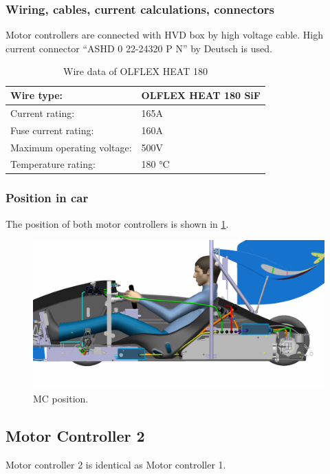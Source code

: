 \subsubsection{Wiring, cables, current calculations, connectors}

Motor controllers are connected with HVD box by high voltage cable. High current connector “ASHD 0 22-24320 P N” by Deutsch is used. 

\begin{table}[H]
	\centering
	\caption{Wire data of OLFLEX HEAT 180}
	\begin{tabularx}{\textwidth}{|X|X|}\hline
		Wire type: & OLFLEX HEAT 180 SiF  \\[\TableSize]\hline
		Current rating: & 165A \\[\TableSize]\hline
		Fuse current rating: & 160A \\[\TableSize]\hline
		Maximum operating voltage: & 500V \\[\TableSize]\hline
		Temperature rating: & 180 °C \\[\TableSize]\hline
	\end{tabularx}%
	\label{tab:MC:wire}%
\end{table}%

\subsubsection{Position in car}

The position of both motor controllers is shown in \ref{fig:MC:position}.

\begin{figure}[H]
	\centering
	\includegraphics[width=\textwidth]{./img/MC-position.jpg}
	\caption{MC position.}
	\label{fig:MC:position}
\end{figure}
\subsection{Motor Controller 2}
Motor controller 2 is identical as Motor controller 1.




